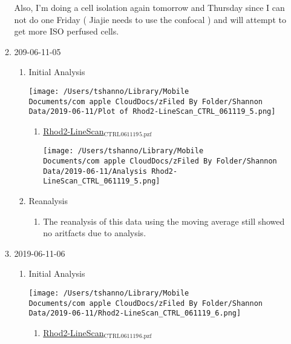 \documentclass[11pt]{article}
\begin{document}
\begin{enumerate}
\begin{enumerate}
Also, I'm doing a cell isolation again tomorrow and Thursday since I can not do one Friday ( Jiajie needs to use the confocal ) and will attempt to get more ISO perfused cells.
\item 209-06-11-05
\label{sec:org3586feb}
\begin{enumerate}
\item Initial Analysis
\label{sec:org5eafc99}
\begin{center}
\texttt{[image: /Users/tshanno/Library/Mobile Documents/com~apple~CloudDocs/zFiled By Folder/Shannon Data/2019-06-11/Plot of Rhod2-LineScan\_CTRL\_061119\_5.png]}
\end{center}
\begin{enumerate}
\item \href{file:///Users/tshanno/Library/Mobile Documents/com\~apple\~CloudDocs/zFiled By Folder/Shannon Data/2019-06-11/Rhod2-LineScan\_CTRL\_061119\_5.pzf}{Rhod2-LineScan\(_{\text{CTRL}}\)\(_{\text{061119}}\)\(_{\text{5.pzf}}\)}
\label{sec:org4d67d4a}
\begin{center}
\texttt{[image: /Users/tshanno/Library/Mobile Documents/com~apple~CloudDocs/zFiled By Folder/Shannon Data/2019-06-11/Analysis Rhod2-LineScan\_CTRL\_061119\_5.png]}
\end{center}
\end{enumerate}
\item Reanalysis
\label{sec:org1d5c8bc}
\begin{enumerate}
\item The reanalysis of this data using the moving average still showed no aritfacts due to analysis.
\label{sec:org0e38a27}
\end{enumerate}
\end{enumerate}
\item 2019-06-11-06
\label{sec:org2e59d33}
\begin{enumerate}
\item Initial Analysis
\label{sec:orgc1dfe73}
\begin{center}
\texttt{[image: /Users/tshanno/Library/Mobile Documents/com~apple~CloudDocs/zFiled By Folder/Shannon Data/2019-06-11/Rhod2-LineScan\_CTRL\_061119\_6.png]}
\end{center}
\begin{enumerate}
\item \href{file:///Users/tshanno/Library/Mobile Documents/com\~apple\~CloudDocs/zFiled By Folder/Shannon Data/2019-06-11/Rhod2-LineScan\_CTRL\_061119\_6.pzf}{Rhod2-LineScan\(_{\text{CTRL}}\)\(_{\text{061119}}\)\(_{\text{6.pzf}}\)}

\end{enumerate}
\end{enumerate}
\end{enumerate}
\end{enumerate}
\end{document}
